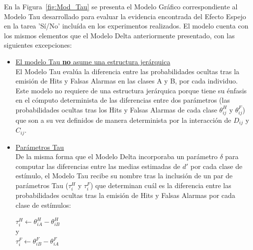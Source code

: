 En la Figura~\ref{fig:Mod_Tau} se presenta el Modelo Gráfico correspondiente al Modelo Tau desarrollado para evaluar la evidencia encontrada del Efecto Espejo en la tarea 'Sí/No' incluída en los experimentos realizados. El modelo cuenta con los mismos elementos que el Modelo Delta anteriormente presentado, con las siguientes excepciones:\\

\begin{itemize}
\item \underline{El modelo Tau \textbf{no} asume una estructura jerárquica}\\

El Modelo Tau evalúa la diferencia entre las probabilidades ocultas tras la emisión de Hits y Falsas Alarmas en las clases A y B, por cada individuo. Este modelo no requiere de una estructura jerárquica porque tiene su énfasis en el cómputo determinista de las diferencias entre dos parámetros (las probabilidades ocultas tras los Hits y Falsas Alarmas de cada clase $\theta^H_{ij}$ y $\theta^F_{ij}$) que son a su vez definidos de manera determinista por la interacción de $D_{ij}$ y $C_{ij}$.

\item \underline{Parámetros Tau}\\

De la misma forma que el Modelo Delta incorporaba un parámetro $\delta$ para computar las diferencias entre las medias estimadas de $d'$ por cada clase de estímulo, el Modelo Tau recibe su nombre tras la inclusión de un par de parámetros Tau ($\tau^H_{i}$ y $\tau^F_{i}$) que determinan cuál es la diferencia entre las probabilidades ocultas tras la emisión de Hits y Falsas Alarmas por cada clase de estímulos:\\

\begin{center}
$\tau^H_{i}\gets \theta^H_{iA}-\theta^H_{iB}$\\
y\\
$\tau^F_{i}\gets \theta^F_{iB}-\theta^F_{iA}$\\
\end{center}

\end{itemize}

